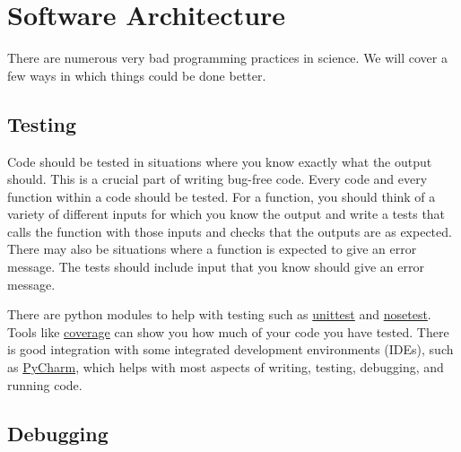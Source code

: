 
\chapter{Software Architecture}

There are numerous very bad programming practices in science. We will
cover a few ways in which things could be done better. 



\section{Testing\label{sec:testing}}

Code should be tested in situations where you know exactly what the
output should. This is a crucial part of writing bug-free code. Every
code and every function within a code should be tested. For a function,
you should think of a variety of different inputs for which you know
the output and write a tests that calls the function with those inputs
and checks that the outputs are as expected. There may also be situations
where a function is expected to give an error message. The tests should
include input that you know should give an error message.

There are python modules to help with testing such as \url{unittest}
and \url{nosetest}. Tools like \url{coverage} can show you how much
of your code you have tested. There is good integration with some
integrated development environments (IDEs), such as \url{PyCharm},
which helps with most aspects of writing, testing, debugging, and
running code.

\clearpage{}

\section{Debugging}

